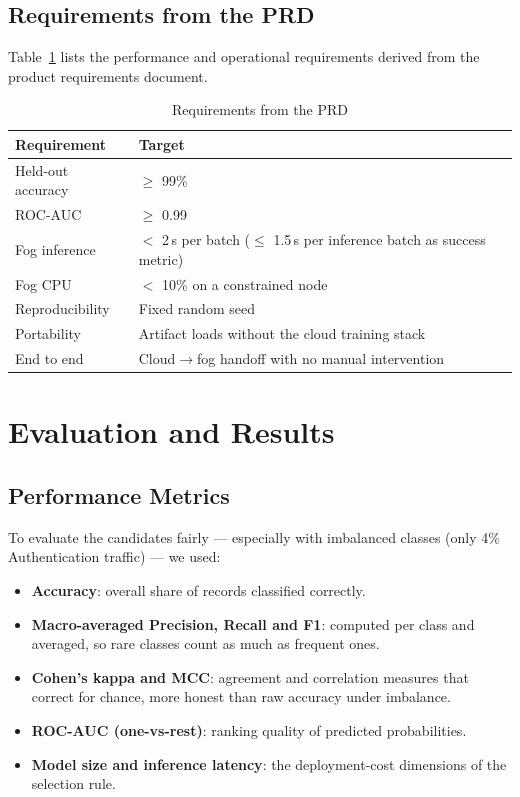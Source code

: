 \documentclass[12pt,a4paper]{article}
\begin{document}
\subsection{Requirements from the PRD}
Table~\ref{tab:prd} lists the performance and operational requirements derived from
the product requirements document.

\begin{table}[H]
\caption{Requirements from the PRD}
\label{tab:prd}
\centering
\small
\begin{tabular}{p{3.2cm}p{9.5cm}}
\toprule
\textbf{Requirement} & \textbf{Target}\\
\midrule
Held-out accuracy & $\ge$ 99\%\\
ROC-AUC & $\ge$ 0.99\\
Fog inference & $<$ 2\,s per batch ($\le$ 1.5\,s per inference batch as success metric)\\
Fog CPU & $<$ 10\% on a constrained node\\
Reproducibility & Fixed random seed\\
Portability & Artifact loads without the cloud training stack\\
End to end & Cloud$\rightarrow$fog handoff with no manual intervention\\
\bottomrule
\end{tabular}
\end{table}

\clearpage
\section{Evaluation and Results}

\subsection{Performance Metrics}
To evaluate the candidates fairly --- especially with imbalanced classes (only 4\%
Authentication traffic) --- we used:
\begin{itemize}
  \item \textbf{Accuracy}: overall share of records classified correctly.
  \item \textbf{Macro-averaged Precision, Recall and F1}: computed per class and
        averaged, so rare classes count as much as frequent ones.
  \item \textbf{Cohen's kappa and MCC}: agreement and correlation measures that
        correct for chance, more honest than raw accuracy under imbalance.
  \item \textbf{ROC-AUC (one-vs-rest)}: ranking quality of predicted probabilities.
  \item \textbf{Model size and inference latency}: the deployment-cost dimensions of
        the selection rule.
\end{itemize}
\end{document}
